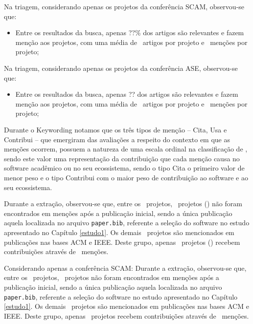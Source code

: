 Na triagem, considerando apenas os projetos da conferência SCAM, observou-se que:

\begin{itemize}
  \item Entre os resultados da busca, apenas ??\% dos artigos são relevantes e
    fazem menção aos projetos, com uma média de \ScreeningUniqueSCAMMean \ artigos
    por projeto e \ScreeningSCAMMean \ menções por projeto;
\end{itemize}

Na triagem, considerando apenas os projetos da conferência ASE, observou-se que:

\begin{itemize}
  \item Entre os resultados da busca, apenas ?? dos artigos são relevantes e
    fazem menção aos projetos, com uma média de \ScreeningUniqueASEMean \ artigos
    por projeto e \ScreeningASEMean \ menções por projeto;
\end{itemize}

Durante o Keywording notamos que os três tipos de menção -- Cita, Usa e
Contribui -- que emergiram das avaliações a respeito do contexto em que as
menções ocorrem, possuem a natureza de uma escala ordinal na classificação de
, sendo este valor
uma representação da contribuição que cada menção causa no software acadêmico
ou no seu ecossistema, sendo o tipo Cita o primeiro valor de menor peso e o
tipo Contribui com o maior peso de contribuição ao software e ao seu
ecossistema.

Durante a extração, observou-se que, 
entre os \SoftwareCount \ projetos, \SoftwareNotMentionedCount \ projetos
() não foram encontrados em menções
após a publicação inicial, sendo a única publicação aquela localizada no
arquivo \texttt{paper.bib}, referente a seleção do software no estudo
apresentado no Capítulo \ref{estudo1}.
%
Os demais \MentionsStudyDois \ projetos são mencionados em publicações nas
bases ACM e IEEE. Deste grupo, apenas \ContributeStudyDoisSoftware \ projetos
() recebem contribuições através de
\ContributeStudyDoisCount \ menções.

Considerando apenas a conferência SCAM: Durante a extração, observou-se que, 
entre os \SoftwareSCAMCount \ projetos, \SoftwareNotMentionedSCAMCount \ projetos
não foram encontrados em menções
após a publicação inicial, sendo a única publicação aquela localizada no
arquivo \texttt{paper.bib}, referente a seleção do software no estudo
apresentado no Capítulo \ref{estudo1}.
%
Os demais \MentionsStudyDoisSCAM \ projetos são mencionados em publicações nas
bases ACM e IEEE. Deste grupo, apenas \ContributeStudyDoisSoftwareSCAM \ projetos
recebem contribuições através de
\ContributeStudyDoisSCAMCount \ menções.

